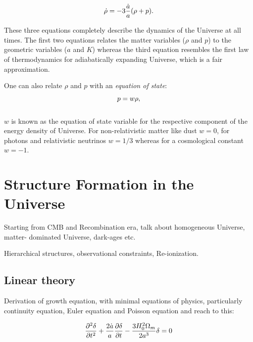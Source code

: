 \begin{equation}
\centering
\dot{\rho} = -3 \dfrac{\dot{a}}{a}(\rho + p).
\label{eqn:fe3}
\end{equation}

These three equations completely describe the dynamics of the Universe at all times.
The first two equations relates the matter variables ($\rho$ and $p$) to the geometric
variables ($a$ and $K$) whereas the third equation resembles the first law of 
thermodynamics for adiabatically expanding Universe, which is a fair approximation.

One can also relate $\rho$ and $p$ with an {\it equation of state}:

\begin{equation}
\centering
p = w \rho,
\label{eqn:eos}
\end{equation}
\\
$w$ is known as the equation of state variable for the respective component
of the energy density of Universe. For non-relativistic matter like dust $w=0$,
for photons and relativistic neutrinos $w=1/3$ whereas for a cosmological constant
$w=-1$.





\section{Structure Formation in the Universe}

Starting from CMB and Recombination era, talk about homogeneous Universe, matter-
dominated Universe, dark-ages etc.

Hierarchical structures, observational constraints, Re-ionization.

\subsection{Linear theory}

Derivation of growth equation, with minimal equations of physics, particularly
continuity equation, Euler equation and Poisson equation and reach to this:

\begin{equation}
\centering
\dfrac{\partial^2\delta}{\partial t^2} + \dfrac{2\dot{a}}{a} \dfrac{\partial\delta}{\partial t}
 - \dfrac{3H_0^2 \Omega_m}{2a^3} \delta = 0
\end{equation}

